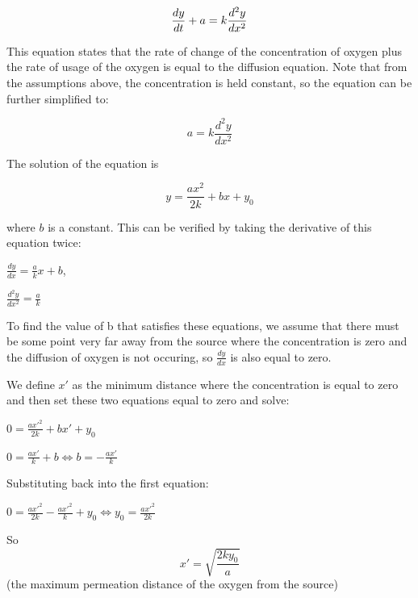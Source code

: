 \documentclass{article}
\begin{document}
\begin{equation}
\frac{dy}{dt} + a = k \* \frac{d^2y}{dx^2}
\end{equation}

This equation states that the rate of change of the concentration of oxygen plus the rate of usage of the oxygen is equal to the diffusion equation.
Note that from the assumptions above, the concentration is held constant, so the equation can be further simplified to:

\begin{equation}
    a = k \frac{d^2y}{dx^2}
    \label{eq:oxygen}
\end{equation}
    
The solution of the equation is 

\begin{equation}
y = \frac{ax^2}{2k} + bx + y_0
\end{equation}

where $b$ is a constant.
This can be verified by taking the derivative of this equation twice: 

$ \frac{dy}{dx} = \frac{a}{k}x + b$,

\vspace*{0.25cm}

$ \frac{d^2y}{dx^2} = \frac{a}{k}$
\vspace*{0.25cm}

To find the value of b that satisfies these equations, we assume that there must be some point 
very far away from the source where the concentration is zero and the diffusion of oxygen is not occuring,
so $\frac{dy}{dx}$ is also equal to zero. 


We define $x'$ as the minimum distance where the concentration is equal to zero and then set these two equations equal to zero and solve:

\vspace*{0.25cm}
$ 0 = \frac{a{x'}^2}{2k} + bx' + y_0 $
\vspace*{0.25cm}

$ 0 = \frac{ax'}{k} + b \Leftrightarrow b = -\frac{ax'}{k}$
\vspace*{0.5cm}

Substituting back into the first equation:
\vspace*{0.5cm}

$ 0 = \frac{a{x'}^2}{2k} - \frac{a{x'}^2}{k} + y_0 \Leftrightarrow y_0 = \frac{a{x'}^2}{2k}$

So 
\begin{equation}
    x' = \sqrt{\frac{2ky_0}{a}}
\end{equation}
(the maximum permeation distance of the oxygen from the source)
\end{document}
